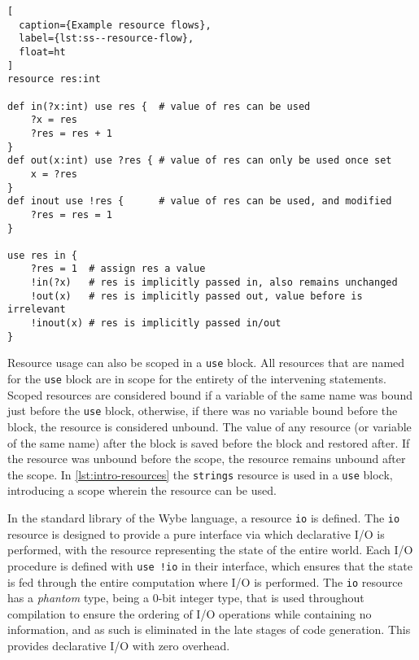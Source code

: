 \begin{lstlisting}[
  caption={Example resource flows},
  label={lst:ss--resource-flow},
  float=ht
]
resource res:int

def in(?x:int) use res {  # value of res can be used 
    ?x = res             
    ?res = res + 1
}
def out(x:int) use ?res { # value of res can only be used once set 
    x = ?res
}
def inout use !res {      # value of res can be used, and modified
    ?res = res = 1
}

use res in {
    ?res = 1  # assign res a value
    !in(?x)   # res is implicitly passed in, also remains unchanged
    !out(x)   # res is implicitly passed out, value before is irrelevant
    !inout(x) # res is implicitly passed in/out
}
\end{lstlisting}

Resource usage can also be scoped in a \texttt{use} block. All resources that are named for the \texttt{use} block are in scope for the entirety of the intervening statements. Scoped resources are considered bound if a variable of the same name was bound just before the \texttt{use} block, otherwise, if there was no variable bound before the block, the resource is considered unbound. The value of any resource (or variable of the same name) after the block is saved before the block and restored after. If the resource was unbound before the scope, the resource remains unbound after the scope. In \cref{lst:intro-resources} the \texttt{strings} resource is used in a \texttt{use} block, introducing a scope wherein the resource can be used.

In the standard library of the Wybe language, a resource \texttt{io} is defined. The \texttt{io} resource is designed to provide a pure interface via which declarative I/O is performed, with the resource representing the state of the entire world. Each I/O procedure is defined with \texttt{use !io} in their interface, which ensures that the state is fed through the entire computation where I/O is performed. The \texttt{io} resource has a \textit{phantom} type, being a 0-bit integer type, that is used throughout compilation to ensure the ordering of I/O operations while containing no information, and as such is eliminated in the late stages of code generation. This provides declarative I/O with zero overhead.

